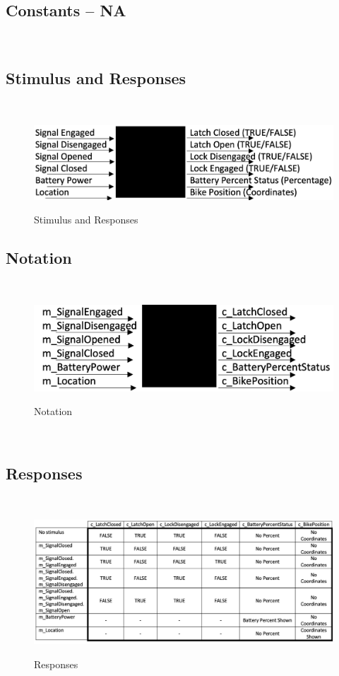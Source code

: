 \documentclass[12pt]{article}
\begin{document}
\subsection{Constants -- NA}
~\newline
\subsection{Stimulus and Responses}
~\newline
\begin{figure}[h!]
 \begin{center}
 {
 \includegraphics[width=0.6\linewidth]{./StimulusandResponses.jpeg}
 }
 \caption{\label{Stimulus and Responses} Stimulus and Responses}
 \end{center}
 \end{figure}
\subsection{Notation}
~\newline
\begin{figure}[h!]
 \begin{center}
 {
 \includegraphics[width=0.6\linewidth]{./Notation.jpeg}
 }
 \caption{\label{Notation} Notation}
 \end{center}
 \end{figure}
~\newpage
\subsection{Responses}
~\newline
\begin{figure}[h!]
 \begin{center}
 {
 \includegraphics[width=0.9\linewidth]{./Responses.jpeg}
 }
 \caption{\label{Responses} Responses}
 \end{center}
 \end{figure}
\end{document}
